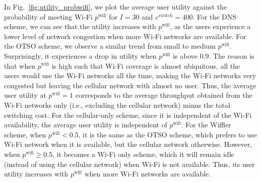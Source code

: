 \documentclass[journal]{IEEEtran}
\begin{document}
	In Fig.~\ref{fig:utility_probwifi}, we plot the average user utility against the probability of meeting Wi-Fi $p^{\text{wifi}}$ for $I = 30$ and $c^{\textit{switch}} = 400$.
	For the DNS scheme, we can see that the utility increases with $p^{\text{wifi}}$, as the users experience a lower level of network congestion when more Wi-Fi networks are available.
	For the OTSO scheme, we observe a similar trend from small to medium $p^{\text{wifi}}$. Surprisingly, it experiences a drop in utility when $p^{\text{wifi}}$ is above $0.9$. The reason is that when $p^{\text{wifi}}$ is high such that Wi-Fi coverage is almost ubiquitous, all the users would use the Wi-Fi networks all the time, making the Wi-Fi networks very congested but leaving the cellular network with almost no user. Thus, the average user utility at $p^{\text{wifi}} = 1$ corresponds to the average throughput obtained from the Wi-Fi networks only (i.e., excluding the cellular network) minus the total switching cost.
	For the cellular-only scheme, since it is independent of the Wi-Fi availability, the average user utility is independent of $p^{\text{wifi}}$. 
	For the Wiffler scheme, when $p^{\text{wifi}} < 0.5$, it is the same as the OTSO scheme, which prefers to use Wi-Fi network when it is available, but the cellular network otherwise. However, when $p^{\text{wifi}} \geq 0.5$, it becomes a Wi-Fi only scheme, which it will remain idle (instead of using the cellular network) when Wi-Fi is not available. Thus, its user utility increases with $p^{\text{wifi}}$ when more Wi-Fi networks are available.


\end{document}

